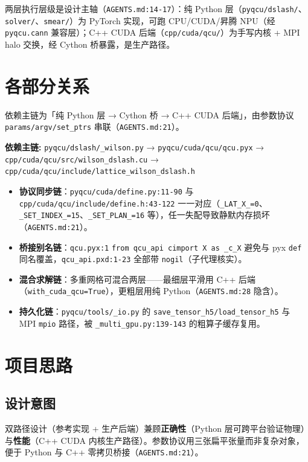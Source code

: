 \documentclass[UTF8]{ctexart}
\begin{document}
两层执行层级是设计主轴（\texttt{AGENTS.md:14-17}）：纯 Python 层（\texttt{pyqcu/dslash/}、\texttt{solver/}、\texttt{smear/}）为 PyTorch 实现，可跑 CPU/CUDA/昇腾 NPU（经 \texttt{pyqcu.cann} 兼容层）；C++ CUDA 后端（\texttt{cpp/cuda/qcu/}）为手写内核 + MPI halo 交换，经 Cython 桥暴露，是生产路径。

\section{各部分关系}

依赖主链为「纯 Python 层 → Cython 桥 → C++ CUDA 后端」，由参数协议 \nolinkurl{params/argv/set_ptrs} 串联（\texttt{AGENTS.md:21}）。

\begin{keybox}
\textbf{依赖主链:} \textcolor{relation}{\nolinkurl{pyqcu/dslash/_wilson.py} → \nolinkurl{pyqcu/cuda/qcu/qcu.pyx} → \nolinkurl{cpp/cuda/qcu/src/wilson_dslash.cu} → \nolinkurl{cpp/cuda/qcu/include/lattice_wilson_dslash.h}}
\end{keybox}

\begin{itemize}
  \item \textbf{协议同步链}：\texttt{pyqcu/cuda/define.py:11-90} 与 \texttt{cpp/cuda/qcu/include/define.h:43-122} 一一对应（\texttt{\_LAT\_X\_=0}、\texttt{\_SET\_INDEX\_=15}、\texttt{\_SET\_PLAN\_=16} 等），任一失配导致静默内存损坏（\texttt{AGENTS.md:21}）。
  \item \textbf{桥接别名链}：\texttt{qcu.pyx:1} \texttt{from qcu\_api cimport X as \_c\_X} 避免与 pyx \texttt{def} 同名覆盖，\texttt{qcu\_api.pxd:1-23} 全部带 \texttt{nogil}（子代理核实）。
  \item \textbf{混合求解链}：多重网格可混合两层——最细层平滑用 C++ 后端（\texttt{with\_cuda\_qcu=True}），更粗层用纯 Python（\texttt{AGENTS.md:28} 隐含）。
  \item \textbf{持久化链}：\texttt{pyqcu/tools/\_io.py} 的 \texttt{save\_tensor\_h5/load\_tensor\_h5} 与 MPI \texttt{mpio} 路径，被 \texttt{\_multi\_gpu.py:139-143} 的粗算子缓存复用。
\end{itemize}

\section{项目思路}

\subsection{设计意图}
双路径设计（参考实现 + 生产后端）兼顾\textbf{正确性}（Python 层可跨平台验证物理）与\textbf{性能}（C++ CUDA 内核生产路径）。参数协议用三张扁平张量而非复杂对象，便于 Python 与 C++ 零拷贝桥接（\texttt{AGENTS.md:21}）。
\end{document}

